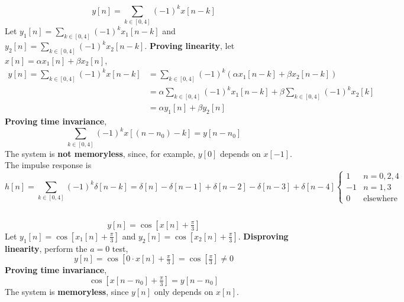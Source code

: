 \documentclass{article}
\begin{document}
\subsection{}

\begin{equation}
    y[n] = \sum_{k \in [0, 4]} (-1)^k x[n - k]
\end{equation}
Let \(y_1[n] = \sum_{k \in [0, 4]} (-1)^k x_1[n - k]\) and \(y_2[n] = \sum_{k \in [0, 4]} (-1)^k x_2[n - k]\).
\textbf{Proving linearity}, let \(x[n] = \alpha x_1[n] + \beta x_2[n]\),
\begin{align}
    y[n] = \sum_{k \in [0, 4]} (-1)^k x[n - k] &= \sum_{k \in [0, 4]} (-1)^k \left(\alpha x_1[n - k] + \beta x_2[n - k]\right) \\
    &= \alpha \sum_{k \in [0, 4]} (-1)^k x_1[n - k] + \beta \sum_{k \in [0, 4]} (-1)^k x_2[k] \\
    &= \alpha y_1[n] + \beta y_2[n]
\end{align}
\textbf{Proving time invariance},
\begin{equation}
    \sum_{k \in [0, 4]} (-1)^k x[(n - n_0) - k] = y[n - n_0]
\end{equation}
The system is \textbf{not memoryless}, since, for example, \(y[0]\) depends on \(x[-1]\).
The impulse response is
\begin{equation}
    h[n] = \sum_{k \in [0, 4]} (-1)^k \delta [n - k] = \delta[n] - \delta[n - 1] + \delta[n - 2] - \delta[n - 3] + \delta[n - 4] 
    \begin{cases}
        1 & n = 0, 2, 4 \\
        -1 & n = 1, 3 \\
        0 & \text{elsewhere}
    \end{cases}
\end{equation}

\subsection{}

\begin{equation}
    y[n] = \cos[x[n] + \tfrac{\pi}{3}]
\end{equation}
Let \(y_1[n] = \cos[x_1[n] + \tfrac{\pi}{3}]\) and \(y_2[n] = \cos[x_2[n] + \tfrac{\pi}{3}]\).
\textbf{Disproving linearity}, perform the \(a = 0\) test,
\begin{equation}
    y[n] = \cos[0 \cdot x[n] + \tfrac{\pi}{3}] = \cos[\tfrac{\pi}{3}] \neq 0
\end{equation}
\textbf{Proving time invariance},
\begin{equation}
    \cos[x[n - n_0] + \tfrac{\pi}{3}] = y[n - n_0]
\end{equation}
The system is \textbf{memoryless}, since \(y[n]\) only depends on \(x[n]\).
\end{document}
